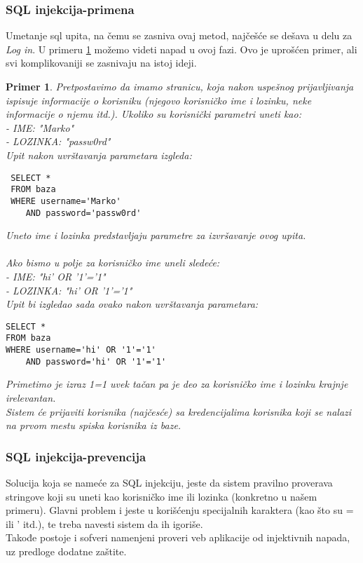 \documentclass[a4paper]{article}
\newtheorem{primer}{Primer}[section]
\begin{document}
\subsubsection{SQL injekcija-primena}
Umetanje sql upita, na \v{c}emu se zasniva ovaj metod, naj\v{c}e\v{s}\'{c}e se de\v{s}ava u delu za \textit{Log in}. U primeru \ref{primer2} možemo videti napad u ovoj fazi. Ovo je upro\v{s}\'{c}en primer, ali svi komplikovaniji se zasnivaju na istoj ideji.
\begin{primer}
\label{primer2}
Pretpostavimo da imamo stranicu, koja nakon uspe\v{s}nog prijavljivanja ispisuje informacije o korisniku (njegovo korisni\v{c}ko ime i lozinku, neke informacije o njemu itd.). Ukoliko su korisnički parametri uneti kao:\\
- IME: "Marko"\\
- LOZINKA: "passw0rd"\\
Upit nakon uvrštavanja parametara izgleda:
\begin{lstlisting}
 SELECT * 
 FROM baza 
 WHERE username='Marko'
 	AND password='passw0rd'
\end{lstlisting}
Uneto ime i lozinka predstavljaju parametre za izvr\v{s}avanje ovog upita.\\\\
Ako bismo u polje za korisni\v{c}ko ime uneli slede\'{c}e:\\
- IME: "hi' OR '1'='1"\\
- LOZINKA: "hi' OR '1'='1"\\
Upit bi izgledao sada ovako nakon uvrštavanja parametara:
\begin{lstlisting}
SELECT * 
FROM baza 
WHERE username='hi' OR '1'='1' 
	AND password='hi' OR '1'='1'
\end{lstlisting}
Primetimo je izraz 1=1 uvek ta\v{c}an pa je deo za korisni\v{c}ko ime i lozinku krajnje irelevantan.\\
Sistem \'{c}e prijaviti korisnika (naj\v{c}es\'{c}e) sa kredencijalima korisnika koji se nalazi na prvom mestu spiska korisnika iz baze.\\
\end{primer}
\subsubsection{SQL injekcija-prevencija}
Solucija koja se name\'{c}e za SQL injekciju, jeste da sistem pravilno proverava stringove koji su uneti kao korisni\v{c}ko ime ili lozinka (konkretno u na\v{s}em primeru). Glavni problem i jeste u kori\v{s}\'{c}enju specijalnih karaktera (kao \v{s}to su = ili ' itd.), te treba navesti sistem da ih igori\v{s}e.\\
Takođe postoje i sofveri namenjeni proveri  veb aplikacije od injektivnih napada, uz predloge dodatne za\v{s}tite.
\end{document}
